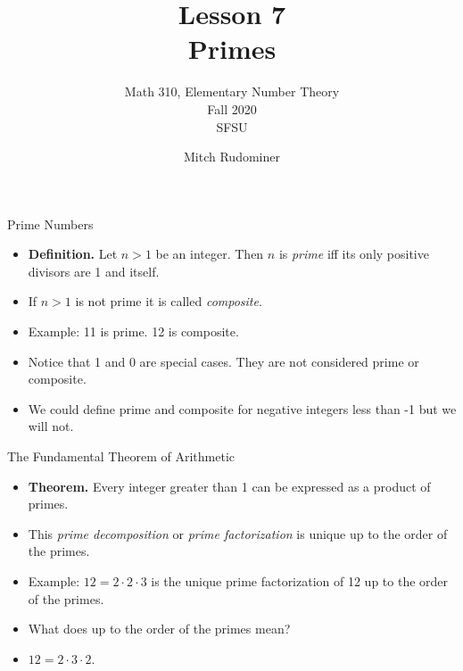 \documentclass{beamer}
\title{Lesson 7 \\ Primes}
\subtitle{Math 310, Elementary Number Theory \\ Fall 2020 \\ SFSU}
\author{Mitch Rudominer}
\date{}
\begin{document}
\begin{frame}
  \titlepage
\end{frame}


\begin{frame}{Prime Numbers}

\begin{itemize}
  \item \textbf{Definition.} Let $n>1$ be an integer. Then $n$ is \emph{prime} iff its only positive divisors are 1 and itself.
  \item If $n>1$ is not prime it is called \emph{composite}.
  \item Example: 11 is prime. 12 is composite.
  \item Notice that 1 and 0 are special cases. They are not considered prime or composite.
  \item We could define prime and composite for negative integers less than -1 but we will not.
\end{itemize}

\end{frame}


\begin{frame}{The Fundamental Theorem of Arithmetic}

\begin{itemize}
  \item \textbf{Theorem.} Every integer greater than 1 can be expressed as a product of primes.
  \item This \emph{prime decomposition} or \emph{prime factorization} is unique up to the order of the primes.
  \item Example: $12 = 2\cdot 2 \cdot 3$ is the unique prime factorization of 12 up to the order of the primes.
  \item What does up to the order of the primes mean?
  \item $12 = 2 \cdot 3 \cdot 2$.
\end{itemize}

\end{frame}
\end{document}
